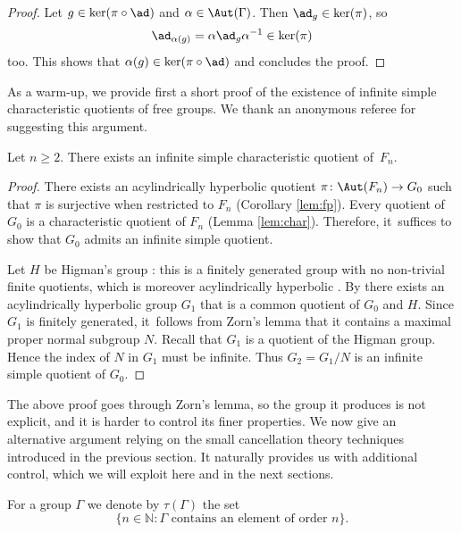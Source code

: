 \begin{proof}
Let $g \in \ker(\pi \circ \ad)$ and $\alpha \in \Aut(\Gamma)$. Then $\ad_g \in \ker(\pi)$, so
\[
\ad_{\alpha(g)} = \alpha \ad_g \alpha^{-1} \in \ker(\pi)
\]
too. This shows that $\alpha(g) \in \ker(\pi \circ \ad)$ and concludes the proof.
\end{proof}

As a warm-up, we provide first a short proof of the existence of infinite simple characteristic quotients of free groups.
We thank an anonymous referee for suggesting this argument.

\begin{theorem}
\label{res: referee statement}
Let $n\geq 2$.
There exists an infinite simple characteristic quotient of~$F_n$.
\end{theorem}

\begin{proof}
There exists an acylindrically hyperbolic quotient $\pi \colon \Aut(F_n) \to G_0$ such that $\pi$ is surjective when restricted to $F_n$ (Corollary \ref{lem:fp}). Every quotient of $G_0$ is a characteristic quotient of $F_n$ (Lemma \ref{lem:char}). Therefore, it~suffices to show that $G_0$ admits an infinite simple quotient.

Let $H$ be Higman's group \cite{higman}: this is a finitely generated group with no non-trivial finite quotients, which is moreover acylindrically hyperbolic \cite[Cor.\,4.26]{MO}.
By \cite[Cor.\,1.6]{hull} there exists an acylindrically hyperbolic group $G_1$ that is a common quotient of $G_0$ and $H$.
Since $G_1$ is finitely generated, it~follows from Zorn's lemma that it contains a maximal proper normal subgroup $N$.
Recall that $G_1$ is a quotient of the Higman group.
Hence the index of $N$ in $G_1$ must be infinite.
Thus $G_2 = G_1/N$ is an infinite simple quotient of $G_0$.
\end{proof}

\begin{remark}
The above proof goes through Zorn's lemma, so the group it produces is not explicit, and it is harder to control its finer properties. We now give an alternative argument relying on the small cancellation theory techniques introduced in the previous section. It naturally provides us with additional control, which we will exploit here and in the next sections.
\end{remark}

\begin{definition}
\label{def:tau}
For a group $\Gamma$ we denote by $\tau(\Gamma)$ the set
\[
\{ n \in \mathbb{N} : \Gamma \text{ contains an element of order } n\}.
\]
\end{definition}

